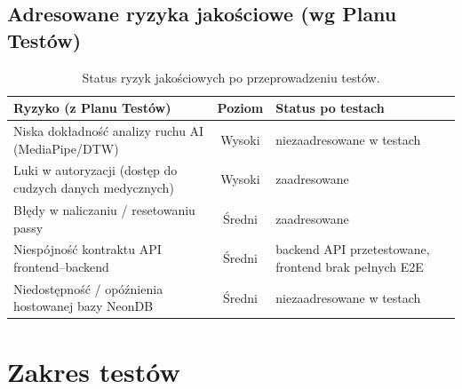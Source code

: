 \documentclass[11pt,a4paper]{article}
\begin{document}
\subsection{Adresowane ryzyka jakościowe (wg Planu Testów)}
\begin{table}[h]
\centering
\begin{tabularx}{\textwidth}{Y c Y}
\toprule
\textbf{Ryzyko (z Planu Testów)} & \textbf{Poziom} & \textbf{Status po testach} \\
\midrule
Niska dokładność analizy ruchu AI (MediaPipe/DTW) & \textcolor{riskhigh}{Wysoki} & niezaadresowane w testach \\
Luki w autoryzacji (dostęp do cudzych danych medycznych) & \textcolor{riskhigh}{Wysoki} & zaadresowane \\
Błędy w naliczaniu / resetowaniu passy & \textcolor{riskmed}{Średni} & zaadresowane \\
Niespójność kontraktu API frontend–backend & \textcolor{riskmed}{Średni} & backend API przetestowane, frontend brak pełnych E2E \\
Niedostępność / opóźnienia hostowanej bazy NeonDB & \textcolor{riskmed}{Średni} & niezaadresowane w testach \\
\bottomrule
\end{tabularx}
\caption{Status ryzyk jakościowych po przeprowadzeniu testów.}
\end{table}

\section{Zakres testów}
\end{document}
